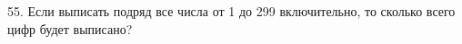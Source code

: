 55. Если выписать подряд все числа от 1 до 299 включительно, то сколько всего цифр будет выписано?\\
